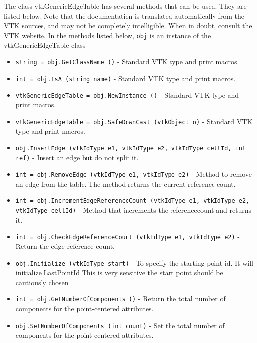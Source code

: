 The class vtkGenericEdgeTable has several methods that can be used.
  They are listed below.
Note that the documentation is translated automatically from the VTK sources,
and may not be completely intelligible.  When in doubt, consult the VTK website.
In the methods listed below, \verb|obj| is an instance of the vtkGenericEdgeTable class.
\begin{itemize}
\item  \verb|string = obj.GetClassName ()| -  Standard VTK type and print macros.

\item  \verb|int = obj.IsA (string name)| -  Standard VTK type and print macros.

\item  \verb|vtkGenericEdgeTable = obj.NewInstance ()| -  Standard VTK type and print macros.

\item  \verb|vtkGenericEdgeTable = obj.SafeDownCast (vtkObject o)| -  Standard VTK type and print macros.

\item  \verb|obj.InsertEdge (vtkIdType e1, vtkIdType e2, vtkIdType cellId, int ref)| -  Insert an edge but do not split it.

\item  \verb|int = obj.RemoveEdge (vtkIdType e1, vtkIdType e2)| -  Method to remove an edge from the table. The method returns the
 current reference count.

\item  \verb|int = obj.IncrementEdgeReferenceCount (vtkIdType e1, vtkIdType e2, vtkIdType cellId)| -  Method that increments the referencecount and returns it.

\item  \verb|int = obj.CheckEdgeReferenceCount (vtkIdType e1, vtkIdType e2)| -  Return the edge reference count.

\item  \verb|obj.Initialize (vtkIdType start)| -  To specify the starting point id. It will initialize LastPointId
 This is very sensitive the start point should be cautiously chosen

\item  \verb|int = obj.GetNumberOfComponents ()| -  Return the total number of components for the point-centered attributes.
 

\item  \verb|obj.SetNumberOfComponents (int count)| -  Set the total number of components for the point-centered attributes.
 


\end{itemize}

